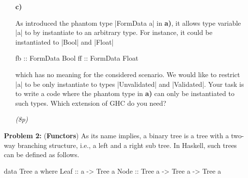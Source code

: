 \documentclass[a4,11pt]{article}
\newif\ifsol
\newcommand{\points}[1]{\hfill \textsl{({#1}p)}}
\begin{document}
\begin{enumerate}
\item[\textbf{c)}] %

  As introduced the phantom type |FormData a| in \textbf{a)}, it allows type
  variable |a| to by instantiate to an arbitrary type.
%
For instance, it could be instantiated to |Bool| and |Float|
\begin{code}
fb :: FormData Bool
ff :: FormData Float
\end{code}
which has no meaning for the considered scenario.
%
We would like to restrict |a| to be only instantiate to types |Unvalidated|
and |Validated|.
%
Your task is to write a code where the phantom type in \textbf{a)} can only be
instantiated to such types. Which extension of GHC do you need?

\ifsol
\begin{code}
{-# LANGUAGE DataKinds #-}

data IsValid = Unvalidated | Validated
data FormData (a :: IsValid) = FormData String
\end{code}
\fi

\points{8}

\end{enumerate}

\newpage
%
%
\noindent
\textbf{Problem 2:} (\textbf{Functors}) As its name implies, a binary tree is a
tree with a two-way branching structure, i.e., a left and a right sub tree. In
Haskell, such trees can be defined as follows.

\begin{code}
data Tree a where
     Leaf  ::  a -> Tree a
     Node  ::  Tree a -> Tree a -> Tree a
\end{code}
\end{document}
